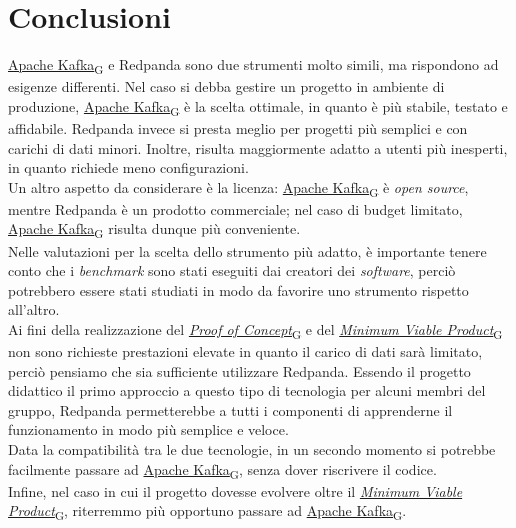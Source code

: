 \section{Conclusioni}
\href{https://7last.github.io/docs/rtb/documentazione-interna/glossario\#apache-kafka}{Apache Kafka\textsubscript{G}} e Redpanda sono due strumenti molto simili, ma rispondono ad esigenze differenti.
Nel caso si debba gestire un progetto in ambiente di produzione, \href{https://7last.github.io/docs/rtb/documentazione-interna/glossario\#apache-kafka}{Apache Kafka\textsubscript{G}} è la scelta ottimale, in quanto è più stabile, testato e affidabile.
Redpanda invece si presta meglio per progetti più semplici e con carichi di dati minori. Inoltre, risulta maggiormente adatto a utenti più
inesperti, in quanto richiede meno configurazioni. \\
Un altro aspetto da considerare è la licenza: \href{https://7last.github.io/docs/rtb/documentazione-interna/glossario\#apache-kafka}{Apache Kafka\textsubscript{G}} è \textit{open source}, mentre Redpanda è un prodotto commerciale; nel caso di
budget limitato, \href{https://7last.github.io/docs/rtb/documentazione-interna/glossario\#apache-kafka}{Apache Kafka\textsubscript{G}} risulta dunque più conveniente.\\
Nelle valutazioni per la scelta dello strumento più adatto, è importante tenere conto che i \textit{benchmark} sono stati eseguiti dai creatori dei \textit{software},
perciò potrebbero essere stati studiati in modo da favorire uno strumento rispetto all'altro.\\
Ai fini della realizzazione del \href{https://7last.github.io/docs/rtb/documentazione-interna/glossario\#proof-of-concept}{\textit{Proof of Concept}\textsubscript{G}} e del \href{https://7last.github.io/docs/rtb/documentazione-interna/glossario\#minimum-viable-product}{\textit{Minimum Viable Product}\textsubscript{G}} non sono richieste prestazioni elevate in quanto
il carico di dati sarà limitato, perciò pensiamo che sia sufficiente utilizzare Redpanda.
Essendo il progetto didattico il primo approccio a questo tipo di tecnologia per alcuni membri del gruppo, Redpanda permetterebbe a tutti i componenti di apprenderne
il funzionamento in modo più semplice e veloce.\\
Data la compatibilità tra le due tecnologie, in un secondo momento si potrebbe facilmente passare ad \href{https://7last.github.io/docs/rtb/documentazione-interna/glossario\#apache-kafka}{Apache Kafka\textsubscript{G}}, senza dover riscrivere il codice.\\
Infine, nel caso in cui il progetto dovesse evolvere oltre il \href{https://7last.github.io/docs/rtb/documentazione-interna/glossario\#minimum-viable-product}{\textit{Minimum Viable Product}\textsubscript{G}}, riterremmo più opportuno passare ad \href{https://7last.github.io/docs/rtb/documentazione-interna/glossario\#apache-kafka}{Apache Kafka\textsubscript{G}}.




